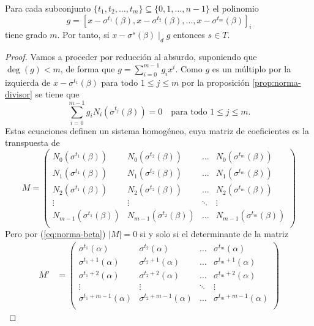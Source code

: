 \begin{lemma}
  \label{lem:pol-t-beta}
  Para cada subconjunto \(\{t_1, t_2, \dots, t_m\} \subseteq \{0, 1, \dots, n - 1\}\) el polinomio 
  \[
    g = \left[x - \sigma^{t_1}(\beta), x - \sigma^{t_{2}}(\beta), \dots, x - \sigma^{t_m}(\beta)\right]_{i}
  \]
  tiene grado \(m\).
  Por tanto, si \(x - \sigma^s(\beta) \mid_d g\) entonces \(s \in T\).
\end{lemma}

\begin{proof}
  Vamos a proceder por reducción al absurdo, suponiendo que \(\deg(g) < m\), de forma que \(g = \sum_{i=0}^{m-1}g_ix^{i}\).
  Como \(g\) es un múltiplo por la izquierda de \(x - \sigma^{t_1}(\beta )\) para todo \(1 \leq j \leq m\) por la proposición \ref{prop:norma-divisor} se tiene que
  \[
    \sum_{i=0}^{m-1}g_iN_i(\sigma^{t_j}(\beta)) = 0 \quad\text{para todo } 1 \leq j \leq m.
  \]
  Estas ecuaciones definen un sistema homogéneo, cuya matriz de coeficientes es la transpuesta de 
  \[
    M = \begin{pmatrix}
      N_0(\sigma^{t_1}(\beta)) & N_0(\sigma^{t_2}(\beta)) & \dots & N_0(\sigma^{t_m}(\beta))\\
      N_1(\sigma^{t_1}(\beta)) & N_1(\sigma^{t_2}(\beta)) & \dots & N_1(\sigma^{t_m}(\beta))\\
      N_2(\sigma^{t_1}(\beta)) & N_2(\sigma^{t_2}(\beta)) & \dots & N_2(\sigma^{t_m}(\beta))\\
      \vdots & \vdots & \ddots & \vdots \\
      N_{m-1}(\sigma^{t_1}(\beta)) & N_{m-1}(\sigma^{t_2}(\beta)) & \dots & N_{m-1}(\sigma^{t_m}(\beta))\\
    \end{pmatrix}
  \]
  Pero por (\ref{eq:norma-beta}) \(|M| = 0\) si y solo si el determinante de la matriz
  \begin{align*}
    M' &= \begin{pmatrix}
      \sigma^{t_1}(\alpha) & \sigma^{t_2}(\alpha) & \dots & \sigma^{t_m}(\alpha)\\
      \sigma^{t_1+1}(\alpha) & \sigma^{t_2+1}(\alpha) & \dots & \sigma^{t_m+1}(\alpha)\\
      \sigma^{t_1+2}(\alpha) & \sigma^{t_2+2}(\alpha) & \dots & \sigma^{t_m+2}(\alpha)\\
      \vdots & \vdots & \ddots & \vdots \\
      \sigma^{t_1+m-1}(\alpha) & \sigma^{t_2+m-1}(\alpha) & \dots & \sigma^{t_m+m-1}(\alpha)\\

\end{pmatrix}
\end{align*}
\end{proof}
